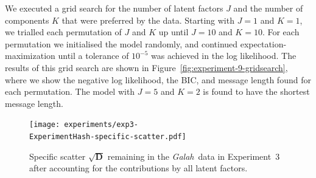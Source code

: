\documentclass[twocolumn]{aastex62}
\newcommand{\project}[1]{\textsl{#1}}
\newcommand{\Galah}{\project{Galah}}
\newcommand{\vect}[1]{\boldsymbol{\mathbf{#1}}}
\renewcommand{\vec}[1]{\vect{#1}}
\newcommand{\specificvariance}{\vec{D}}
\newcommand{\NumLatentFactors}{J}
\newcommand{\NumComponents}{K}
\newcommand{\ExperimentHash}{96ff8}
\begin{document}

We executed a grid search for the number of latent factors $\NumLatentFactors$
and the number of components $\NumComponents$ that were preferred by the data.
Starting with $\NumLatentFactors = 1$ and $\NumComponents = 1$, we trialled each
permutation of $\NumLatentFactors$ and $\NumComponents$ up until $\NumLatentFactors = 10$
and $\NumComponents = 10$. For each permutation we initialised the model randomly,
and continued expectation-maximization until a tolerance of $10^{-5}$ was achieved
in the log likelihood. The results of this grid search are shown in Figure~\ref{fig:experiment-9-gridsearch},
where we show the negative log likelihood, the BIC, and message length found for each permutation.
The model with $J = 5$ and $K = 2$ is found to have the shortest message length.


\begin{figure}
	\texttt{[image: experiments/exp3-\\ExperimentHash-specific-scatter.pdf]}
	\caption{Specific scatter $\sqrt{\specificvariance}$ remaining in the \Galah\ data \citep{Buder:2018}
			 in Experiment~3 after accounting for the contributions by all
			 latent factors.}
    \label{fig:exp3-specific-scatter}
\end{figure}
\end{document}
